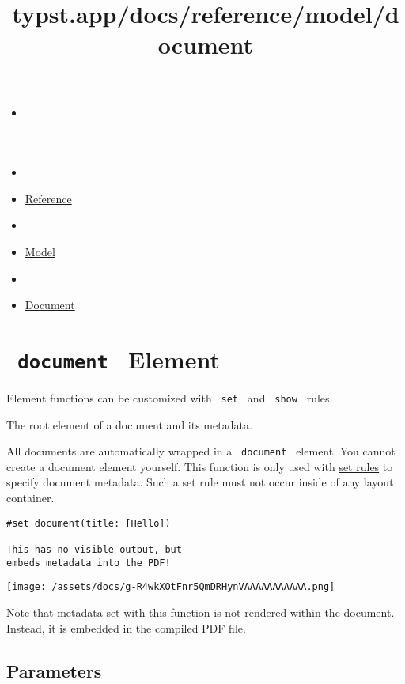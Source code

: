 \title{typst.app/docs/reference/model/document}

\begin{itemize}
\tightlist
\item
  \href{/docs}{}
\item
  
\item
  \href{/docs/reference/}{Reference}
\item
  
\item
  \href{/docs/reference/model/}{Model}
\item
  
\item
  \href{/docs/reference/model/document/}{Document}
\end{itemize}

\section{\texorpdfstring{\texttt{\ document\ } {{ Element
}}}{ document   Element }}\label{summary}

\label{element-tooltip}
Element functions can be customized with \texttt{\ set\ } and
\texttt{\ show\ } rules.

The root element of a document and its metadata.

All documents are automatically wrapped in a \texttt{\ document\ }
element. You cannot create a document element yourself. This function is
only used with \href{/docs/reference/styling/\#set-rules}{set rules} to
specify document metadata. Such a set rule must not occur inside of any
layout container.

\begin{verbatim}
#set document(title: [Hello])

This has no visible output, but
embeds metadata into the PDF!
\end{verbatim}

\texttt{[image: /assets/docs/g-R4wkXOtFnr5QmDRHynVAAAAAAAAAAA.png]}

Note that metadata set with this function is not rendered within the
document. Instead, it is embedded in the compiled PDF file.

\subsection{\texorpdfstring{{ Parameters
}}{ Parameters }}\label{parameters}

